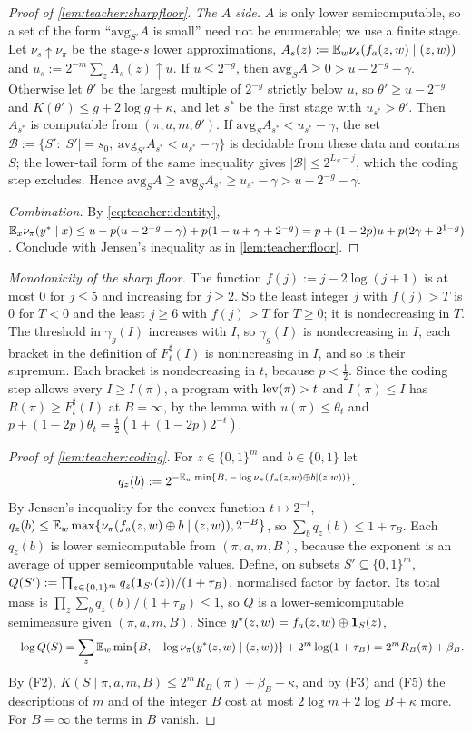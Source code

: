 \begin{proof}[Proof of \cref{lem:teacher:sharpfloor}]
\emph{The $A$ side.} $A$ is only lower semicomputable, so a set of the form ``$\mathrm{avg}_{S'}A$ is small'' need not be enumerable; we use a finite stage. Let $\nu_s\uparrow\nu_\pi$ be the stage-$s$ lower approximations, $A_s(z):=\mathbb{E}_w\nu_s(f_a(z,w)\mid(z,w))$ and $u_s:=2^{-m}\sum_zA_s(z)\uparrow u$. If $u\le2^{-g}$, then $\mathrm{avg}_SA\ge0>u-2^{-g}-\gamma$. Otherwise let $\theta'$ be the largest multiple of $2^{-g}$ strictly below $u$, so $\theta'\ge u-2^{-g}$ and $K(\theta')\le g+2\log g+\kappa$, and let $s^*$ be the first stage with $u_{s^*}>\theta'$. Then $A_{s^*}$ is computable from $(\pi,a,m,\theta')$. If $\mathrm{avg}_SA_{s^*}<u_{s^*}-\gamma$, the set $\mathcal B:=\{S':|S'|=s_0,\ \mathrm{avg}_{S'}A_{s^*}<u_{s^*}-\gamma\}$ is decidable from these data and contains $S$; the lower-tail form of the same inequality gives $|\mathcal B|\le2^{L_S-j}$, which the coding step excludes. Hence $\mathrm{avg}_SA\ge\mathrm{avg}_SA_{s^*}\ge u_{s^*}-\gamma>u-2^{-g}-\gamma$.

\emph{Combination.} By \eqref{eq:teacher:identity}, $\mathbb{E}_x\nu_\pi(y^*\mid x)\le u-p(u-2^{-g}-\gamma)+p(1-u+\gamma+2^{-g})=p+(1-2p)u+p(2\gamma+2^{1-g})$. Conclude with Jensen's inequality as in \cref{lem:teacher:floor}.
\end{proof}

\emph{Monotonicity of the sharp floor.} The function $f(j):=j-2\log(j+1)$ is at most $0$ for $j\le5$ and increasing for $j\ge2$. So the least integer $j$ with $f(j)>T$ is $0$ for $T<0$ and the least $j\ge6$ with $f(j)>T$ for $T\ge0$; it is nondecreasing in $T$. The threshold in $\gamma_g(I)$ increases with $I$, so $\gamma_g(I)$ is nondecreasing in $I$, each bracket in the definition of $F^\sharp_t(I)$ is nonincreasing in $I$, and so is their supremum. Each bracket is nondecreasing in $t$, because $p<\frac12$. Since the coding step allows every $I\ge I(\pi)$, a program with $\operatorname{lev}(\pi)>t$ and $I(\pi)\le I$ has $R(\pi)\ge F^\sharp_t(I)$ at $B=\infty$, by the lemma with $u(\pi)\le\theta_t$ and $p+(1-2p)\theta_t=\frac12(1+(1-2p)2^{-t})$.

\begin{proof}[Proof of \cref{lem:teacher:coding}]
For $z\in\{0,1\}^m$ and $b\in\{0,1\}$ let
\[
q_z(b):=2^{-\mathbb{E}_w\min\{B,\,-\log\nu_\pi(f_a(z,w)\oplus b\mid(z,w))\}}.
\]
By Jensen's inequality for the convex function $t\mapsto2^{-t}$, $q_z(b)\le\mathbb{E}_w\max\{\nu_\pi(f_a(z,w)\oplus b\mid(z,w)),2^{-B}\}$, so $\sum_bq_z(b)\le1+\tau_B$. Each $q_z(b)$ is lower semicomputable from $(\pi,a,m,B)$, because the exponent is an average of upper semicomputable values. Define, on subsets $S'\subseteq\{0,1\}^m$, $Q(S'):=\prod_{z\in\{0,1\}^m}q_z(\mathbf{1}_{S'}(z))/(1+\tau_B)$, normalised factor by factor. Its total mass is $\prod_z\sum_bq_z(b)/(1+\tau_B)\le1$, so $Q$ is a lower-semicomputable semimeasure given $(\pi,a,m,B)$. Since $y^*(z,w)=f_a(z,w)\oplus\mathbf{1}_S(z)$,
\[
-\log Q(S)=\sum_z\mathbb{E}_w\min\{B,-\log\nu_\pi(y^*(z,w)\mid(z,w))\}+2^m\log(1+\tau_B)=2^mR_B(\pi)+\beta_B.
\]
By (F2), $K(S\mid\pi,a,m,B)\le2^mR_B(\pi)+\beta_B+\kappa$, and by (F3) and (F5) the descriptions of $m$ and of the integer $B$ cost at most $2\log m+2\log B+\kappa$ more. For $B=\infty$ the terms in $B$ vanish.
\end{proof}

